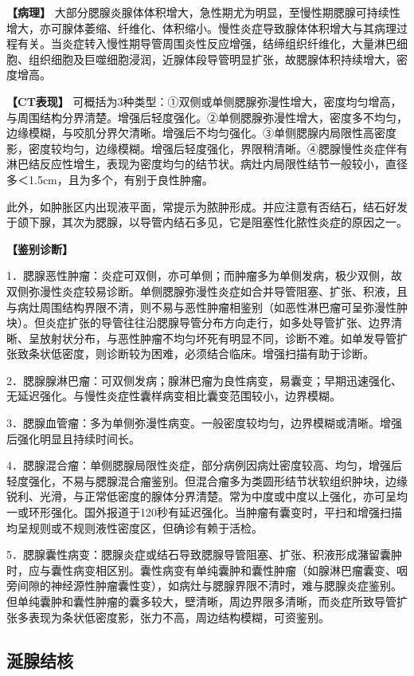 \textbf{【病理】}
大部分腮腺炎腺体体积增大，急性期尤为明显，至慢性期腮腺可持续性增大，亦可腺体萎缩、纤维化、体积缩小。慢性炎症导致腺体体积增大与其病理过程有关。当炎症转入慢性期导管周围炎性反应增强，结缔组织纤维化，大量淋巴细胞、组织细胞及巨噬细胞浸润，近腺体段导管明显扩张，故腮腺体积持续增大，密度增高。

\textbf{【CT表现】}
可概括为3种类型：①双侧或单侧腮腺弥漫性增大，密度均匀增高，与周围结构分界清楚。增强后轻度强化。②单侧腮腺弥漫性增大，密度多不均匀，边缘模糊，与咬肌分界欠清晰。增强后不均匀强化。③单侧腮腺内局限性高密度影，密度较均匀，边缘模糊。增强后轻度强化，界限稍清晰。④腮腺慢性炎症伴有淋巴结反应性增生，表现为密度均匀的结节状。病灶内局限性结节一般较小，直径多＜1.5cm，且为多个，有别于良性肿瘤。

此外，如肿胀区内出现液平面，常提示为脓肿形成。并应注意有否结石，结石好发于颌下腺，其次为腮腺，以导管内结石多见，它是阻塞性化脓性炎症的原因之一。

\textbf{【鉴别诊断】}

1．腮腺恶性肿瘤：炎症可双侧，亦可单侧；而肿瘤多为单侧发病，极少双侧，故双侧弥漫性炎症较易诊断。单侧腮腺弥漫性炎症如合并导管阻塞、扩张、积液，且与病灶周围结构界限不清，则不易与恶性肿瘤相鉴别（如恶性淋巴瘤可呈弥漫性肿块）。但炎症扩张的导管往往沿腮腺导管分布方向走行，如多处导管扩张、边界清晰、呈放射状分布，与恶性肿瘤不均匀坏死有明显不同，诊断不难。如单发导管扩张致条状低密度，则诊断较为困难，必须结合临床。增强扫描有助于诊断。

2．腮腺腺淋巴瘤：可双侧发病；腺淋巴瘤为良性病变，易囊变；早期迅速强化、无延迟强化。与慢性炎症性囊样病变相比囊变范围较小，边界模糊。

3．腮腺血管瘤：多为单侧弥漫性病变。一般密度较均匀，边界模糊或清晰。增强后强化明显且持续时间长。

4．腮腺混合瘤：单侧腮腺局限性炎症，部分病例因病灶密度较高、均匀，增强后轻度强化，不易与腮腺混合瘤鉴别。但混合瘤多为类圆形结节状软组织肿块，边缘锐利、光滑，与正常低密度的腺体分界清楚。常为中度或中度以上强化，亦可呈均一或环形强化。国外报道于120秒有延迟强化。当肿瘤有囊变时，平扫和增强扫描均呈规则或不规则液性密度区，但确诊有赖于活检。

5．腮腺囊性病变：腮腺炎症或结石导致腮腺导管阻塞、扩张、积液形成潴留囊肿时，应与囊性病变相区别。囊性病变有单纯囊肿和囊性肿瘤（如腺淋巴瘤囊变、咽旁间隙的神经源性肿瘤囊性变），如病灶与腮腺界限不清时，难与腮腺炎症鉴别。但单纯囊肿和囊性肿瘤的囊多较大，壁清晰，周边界限多清晰，而炎症所致导管扩张多表现为条状低密度影，张力不高，周边结构模糊，可资鉴别。

\subsection{涎腺结核}

